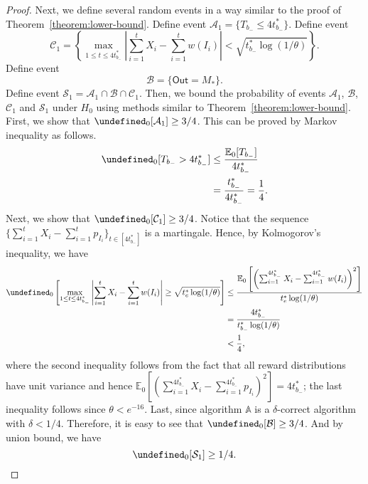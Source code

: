 \documentclass{article}
\newcommand{\E}{\mathbb E}
\newcommand{\out}{\mathsf{Out}}
\let\Pr\undefined
\DeclareMathOperator{\Pr}{Pr}
\begin{document}
\begin{spacing}{1.1}
\begin{proof}
Next, we define several random events in a way similar to the proof of Theorem~\ref{theorem:lower-bound}.
Define event
$\mathcal A_1 = \{T_{b_-} \le 4t_{b_-}^* \}$.
Define event 
$$
\mathcal C_1 = \left\{\max_{1\le t \le 4t_{b_-}^*} \left|\sum_{i=1}^t X_i - \sum_{i=1}^t w(I_i)\right|  < \sqrt{t_{b_-}^*\log(1/\theta)} \right\}.
$$
Define event 
\begin{equation}
\label{eq:lower-sum-b-define}
\mathcal B = \{\out=M_*\}.
\end{equation}
Define event
$\mathcal S_1 = \mathcal A_1 \cap \mathcal B \cap \mathcal C_1$.
Then, we bound the probability of events $\mathcal A_1$, $\mathcal B$, $\mathcal C_1$ and $\mathcal S_1$ under $H_0$ using methods similar to Theorem~\ref{theorem:lower-bound}.
First, we show that $\Pr_0[\mathcal A_1] \ge 3/4$. 
This can be proved by Markov inequality as follows.
\begin{align*}
\Pr_0[T_{b_-} > 4t_{b_-}^*] &\le \frac{\E_0[T_{b_-}]}{4t_{b_-}^*} \\
					  &= \frac{t_{b_-}^*}{4t_{b_-}^*} = \frac14.
\end{align*}
Next, we show that $\Pr_0[\mathcal C_1] \ge 3/4$.
Notice that the sequence $\Big\{\sum_{i=1}^t X_i - \sum_{i=1}^t p_{I_i}\Big\}_{t\in[4t_{b_-}^*]}$ is a martingale.
Hence, by Kolmogorov's inequality, we have
\begin{align*}
\Pr_0\left[\max_{1\le t \le 4t_{b_-}^*} \left|\sum_{i=1}^t X_i - \sum_{i=1}^t w(I_i) \right| \ge \sqrt{t_e^*\log(1/\theta)} \right]
&\le \frac{\E_0\left[ \left(\sum_{i=1}^{4t_{b_-}^*} X_i - \sum_{i=1}^{4t_{b_-}^*} w(I_i)\right)^2\right]}{t_e^*\log(1/\theta)}\\
&= \frac{4t_{b_-}^*}{t_{b_-}^*\log(1/\theta)}\\
&< \frac14,
\end{align*}
where the second inequality follows from the fact that all reward distributions have unit variance and hence
$\E_0\left[ \left(\sum_{i=1}^{4t_{b_-}^*} X_i - \sum_{i=1}^{4t_{b_-}^*} p_{I_i}\right)^2\right] = 4t_{b_-}^*$; the last inequality follows 
since $\theta < e^{-16}$.
Last, since algorithm $\mathbb A$ is a $\delta$-correct algorithm with $\delta < 1/4$. 
Therefore, it is easy to see that 
$\Pr_0[\mathcal B] \ge 3/4$.
And by union bound, we have
$$
\Pr_0[\mathcal S_1] \ge 1/4.
$$


\end{proof}
\end{spacing}
\end{document}
